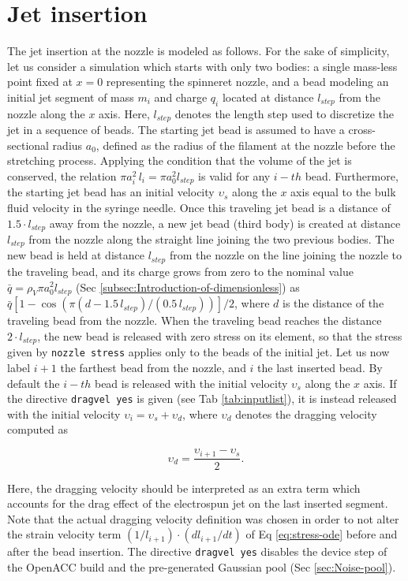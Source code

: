 
\section{Jet insertion\label{subsec:Jet-insertion}}

The jet insertion at the nozzle is modeled as follows. For the sake
of simplicity, let us consider a simulation which starts with only
two bodies: a single mass-less point fixed at $x=0$ representing
the spinneret nozzle, and a bead modeling an initial jet segment of
mass $m_{i}$ and charge $q_{i}$ located at distance $l_{step}$
from the nozzle along the $x$ axis. Here, $l_{step}$ denotes the
length step used to discretize the jet in a sequence of beads. The
starting jet bead is assumed to have a cross-sectional radius $a_{0}$,
defined as the radius of the filament at the nozzle before the stretching
process. Applying the condition that the volume of the jet is conserved,
the relation $\pi a_{i}^{2}\,l_{i}=\pi a_{0}^{2}l_{step}$ is valid
for any $i-th$ bead. Furthermore, the starting jet bead has an initial
velocity $\upsilon_{s}$ along the $x$ axis equal to the bulk fluid
velocity in the syringe needle. Once this traveling jet bead is a
distance of $1.5\cdot l_{step}$ away from the nozzle, a new jet bead
(third body) is created at distance $l_{step}$ from the nozzle along
the straight line joining the two previous bodies. The new bead is held
at distance $l_{step}$ from the nozzle on the line joining the nozzle
to the traveling bead, and its charge grows from zero to the nominal
value $\bar{q}=\rho_{V}\pi a_{0}^{2}l_{step}$
(Sec \ref{subsec:Introduction-of-dimensionless}) as
$\bar{q}\left[1-\cos\left(\pi\left(d-1.5\,l_{step}\right)/\left(0.5\,l_{step}\right)\right)\right]/2$,
where $d$ is the distance of the traveling bead from the nozzle. When
the traveling bead reaches the distance $2\cdot l_{step}$, the new
bead is released with zero stress on its element, so that the stress
given by \texttt{nozzle stress} applies only to the beads of the initial
jet. Let us now label
$i+1$ the farthest bead from the nozzle, and $i$ the last inserted
bead. By default the $i-th$ bead is released with the initial velocity
$\upsilon_{s}$ along the $x$ axis. If the directive \texttt{dragvel yes} is
given (see Tab \ref{tab:inputlist}), it is instead released with the initial
velocity $\upsilon_{i}=\upsilon_{s}+\upsilon_{d}$,
where $\upsilon_{d}$ denotes the dragging velocity computed as

\begin{equation}
\upsilon_{d}=\frac{\upsilon_{i+1}-\upsilon_{s}}{2}.
\end{equation}

Here, the dragging velocity should be interpreted as an extra term
which accounts for the drag effect of the electrospun jet on the last
inserted segment. Note that the actual dragging velocity definition
was chosen in order to not alter the strain velocity term $\left(1/l_{i+1}\right)\cdot\left(dl_{i+1}/dt\right)$
of Eq \ref{eq:stress-ode} before and after the bead insertion. The
directive \texttt{dragvel yes} disables the device step of the OpenACC
build and the pre-generated Gaussian pool (Sec \ref{sec:Noise-pool}).
